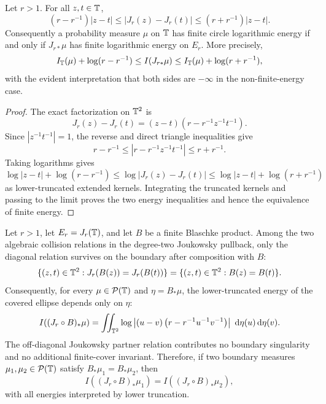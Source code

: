 \begin{lemma}\label{lem:joukowsky-boundary-energy-equivalence}
Let \(r>1\).  For all \(z,t\in\mathbb{T}\),
\[
(r-r^{-1})|z-t|
\le |J_r(z)-J_r(t)|
\le (r+r^{-1})|z-t|.
\]
Consequently a probability measure \(\mu\) on \(\mathbb{T}\) has finite circle logarithmic energy if and only if \(J_{r\ast}\mu\) has finite logarithmic energy on \(E_r\).  More precisely,
\[
I_{\mathbb{T}}(\mu)+\log(r-r^{-1})
\le I(J_{r\ast}\mu)
\le I_{\mathbb{T}}(\mu)+\log(r+r^{-1}),
\]
with the evident interpretation that both sides are \(-\infty\) in the non-finite-energy case.
\end{lemma}

\begin{proof}
The exact factorization on \(\mathbb{T}^2\) is
\[
J_r(z)-J_r(t)=(z-t)\left(r-r^{-1}z^{-1}t^{-1}\right).
\]
Since \(|z^{-1}t^{-1}|=1\), the reverse and direct triangle inequalities give
\[
r-r^{-1}\le |r-r^{-1}z^{-1}t^{-1}|
\le r+r^{-1}.
\]
Taking logarithms gives
\[
\log|z-t|+\log(r-r^{-1})
\le \log|J_r(z)-J_r(t)|
\le \log|z-t|+\log(r+r^{-1})
\]
as lower-truncated extended kernels.  Integrating the truncated kernels and passing to the limit proves the two energy inequalities and hence the equivalence of finite energy.
\end{proof}

\begin{theorem}\label{thm:joukowsky-boundary-skeleton-obstruction}
Let \(r>1\), let \(E_r=J_r(\mathbb{T})\), and let \(B\) be a finite Blaschke product.  Among the two algebraic collision relations in the degree-two Joukowsky pullback, only the diagonal relation survives on the boundary after composition with \(B\):
\[
\{(z,t)\in\mathbb{T}^2:J_r(B(z))=J_r(B(t))\}
=
\{(z,t)\in\mathbb{T}^2:B(z)=B(t)\}.
\]
Consequently, for every \(\mu\in\mathcal P(\mathbb{T})\) and \(\eta=B_\ast\mu\), the lower-truncated energy of the covered ellipse depends only on \(\eta\):
\[
I((J_r\circ B)_\ast\mu)
=
\iint_{\mathbb{T}^2}
\log\left|(u-v)\left(r-r^{-1}u^{-1}v^{-1}\right)\right|
\,\,\mathrm{d}\eta(u)\,\mathrm{d}\eta(v).
\]
The off-diagonal Joukowsky partner relation contributes no boundary singularity and no additional finite-cover invariant.  Therefore, if two boundary measures \(\mu_1,\mu_2\in\mathcal P(\mathbb{T})\) satisfy \(B_\ast\mu_1=B_\ast\mu_2\), then
\[
I((J_r\circ B)_\ast\mu_1)=I((J_r\circ B)_\ast\mu_2),
\]
with all energies interpreted by lower truncation.
\end{theorem}

